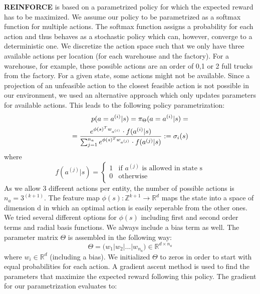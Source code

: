 \documentclass[journal, a4paper]{IEEEtran}
\theoremstyle{plain}
\theoremstyle{definition}
\begin{document}
\textbf{REINFORCE} is based on a parametrized policy for which the expected reward has to be maximized. We assume our policy to be parametrized as a softmax function for multiple actions. The softmax function assigns a probability for each action and thus behaves as a stochastic policy which can, however, converge to a deterministic one. 
We discretize the action space such that we only have three available actions per location (for each warehouse and the factory). For a warehouse, for example, these possible actions are an order of  0,1 or 2 full trucks from the factory. For a given state, some actions might not be available. Since a projection of an unfeasible action to the closest feasible action is not possible in our environment, we used an alternative approach which only updates parameters for available actions. 
This leads to the following policy parametrization:
\begin{align}
    \label{simple_equation}
    p( a = a^{(i)}| s) = \pi_\Theta(a = a^{(i)}|s) =
    \notag
    \\
     =\frac{e^{\phi(s)^T w_{a^{(i)}}}\cdot f(a^{(i)}|s)}{\sum_{j=1}^{n_a} e^{\phi(s)^T w_{a^{(j)}}}\cdot f(a^{(j)}|s)} 
     :=
     \sigma_i(s)
\end{align}
where 
\begin{equation}
   f(a^{(j)}|s) =
   \begin{cases}
     1 & \text{if $a^{(j)}$ is allowed in state s} \\
     0 & \text{otherwise} \\ 
   \end{cases}
\end{equation}
As we allow 3 different actions per entity, the number of possible actions is $n_a = 3^{(k+1)}$. 
The feature map $\phi(s): \mathbb{Z}^{k+1} \rightarrow \mathbb{R}^{d}$ maps the state into a space of dimension d in which an optimal action is easily seperable from the other ones. We tried several different options for $\phi(s)$ including first and second order terms and radial basis functions. We always include a bias term as well.
The parameter matrix $\Theta$ is assembled in the following way:
\begin{equation}
	\Theta = \big(w_1|w_2|...|w_{n_a}\big) \in \mathbb{R}^{d \times n_a }
\end{equation}
where $w_i \in \mathbb{R}^{d}$ (including a bias). We initialized $\Theta$ to zeros in order to start with equal probabilities for each action.
\newline
A gradient ascent method is used to find the parameters that maximize the expected reward following this policy. The gradient for our parametrization evaluates to:
\end{document}
